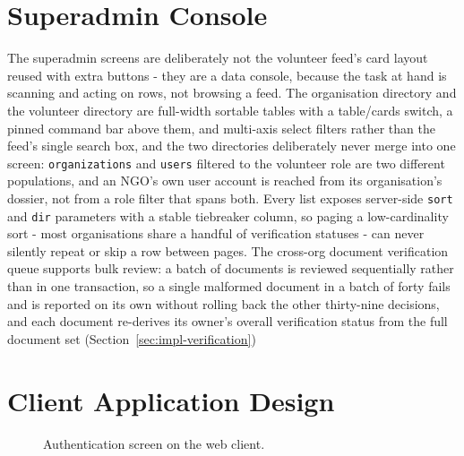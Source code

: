 \section{Superadmin Console}
\label{sec:impl-admin-console}
The superadmin screens are deliberately not the volunteer feed's card layout reused with extra buttons - they are a data console, because the task at hand is scanning and acting on rows, not browsing a feed. The organisation directory and the volunteer directory are full-width sortable tables with a table/cards switch, a pinned command bar above them, and multi-axis select filters rather than the feed's single search box, and the two directories deliberately never merge into one screen: \texttt{organizations} and \texttt{users} filtered to the volunteer role are two different populations, and an NGO's own user account is reached from its organisation's dossier, not from a role filter that spans both. Every list exposes server-side \texttt{sort} and \texttt{dir} parameters with a stable tiebreaker column, so paging a low-cardinality sort - most organisations share a handful of verification statuses - can never silently repeat or skip a row between pages. The cross-org document verification queue supports bulk review: a batch of documents is reviewed sequentially rather than in one transaction, so a single malformed document in a batch of forty fails and is reported on its own without rolling back the other thirty-nine decisions, and each document re-derives its owner's overall verification status from the full document set (Section~\ref{sec:impl-verification})

\section{Client Application Design}
\label{sec:impl-client}

\begin{figure}[H]
    \centering
    \caption{Authentication screen on the web client.}
    \label{fig:navigation}
\end{figure}

